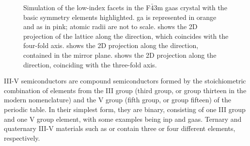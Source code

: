 \begin{figure}
{
    }
    \caption[Low-index facets in the F\(\bar{4}\)3m \acs{gaas} crystal.]{Simulation of the low-index facets in the F\(\bar{4}\)3m \acs{gaas} crystal with the basic symmetry elements highlighted. \Acl{ga} is represented in orange and \acs{as} in pink; atomic radii are not to scale.  shows the 2D projection of the lattice along the  direction, which coincides with the four-fold axis.  shows the 2D projection along the  direction, contained in the mirror plane.  shows the 2D projection along the  direction, coinciding with the three-fold axis.}
    \label{fig:ZB_low_index_facets}
\end{figure}

III-V semiconductors are compound semiconductors formed by the stoichiometric combination of elements from the III group (third group, or group thirteen in the modern nomenclature) and the V group (fifth group, or group fifteen) of the periodic table. In their simplest form, they are binary, consisting of one III group and one V group element, with some examples being \acs{inp} and \acs{gaas}. Ternary and quaternary III-V materials such as  or  contain three or four different elements, respectively. 

